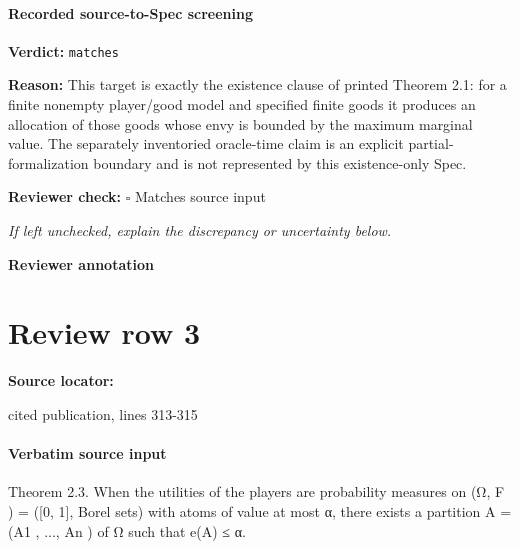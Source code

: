 \documentclass[10pt]{article}
\newcommand{\reviewerbox}{%
  \par\noindent\fbox{\parbox{0.96\linewidth}{\rule{0pt}{0.38in}}}\par
}
\newcommand{\reviewmatch}[1]{%
  \par\noindent\textbf{Reviewer check:} $\square$\; #1\par
  \noindent\emph{If left unchecked, explain the discrepancy or uncertainty below.}\par
}
\begin{document}
\paragraph{Recorded source-to-Spec screening}
\textbf{Verdict:} \texttt{matches}
\\
{\raggedright
\textbf{Reason:} This target is exactly the existence clause of printed Theorem 2.\allowbreak{}1:\allowbreak{} for a finite nonempty player/\allowbreak{}good model and specified finite goods it produces an allocation of those goods whose envy is bounded by the maximum marginal value.\allowbreak{} The separately inventoried oracle-\allowbreak{}time claim is an explicit partial-\allowbreak{}formalization boundary and is not represented by this existence-\allowbreak{}only Spec.\allowbreak{}
\par}
\reviewmatch{Matches source input}
\noindent\textbf{Reviewer annotation}\par
\reviewerbox
\clearpage
\hypertarget{source-claim-488983f780b608da}{}
\section*{Review row 3}
\textbf{Source locator:} {\footnotesize\raggedright cited publication, lines 313-\allowbreak{}315\par}
\paragraph{Verbatim source input}
\begin{ReviewVerbatim}
Theorem 2.3. When the utilities of the players are probability measures on (Ω, F ) = ([0, 1], Borel sets) with atoms
of value at most α, there exists a partition A = (A1 , ..., An )
of Ω such that e(A) ≤ α.
\end{ReviewVerbatim}
\end{document}
